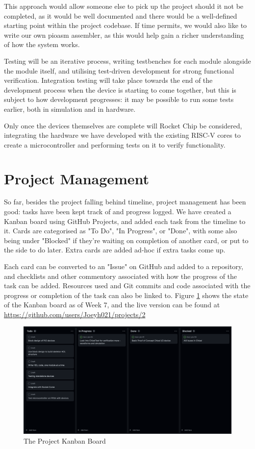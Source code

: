 \documentclass[a4paper,fleqn,12pt]{article}
\begin{document}
This approach would allow someone else to pick up the project should it not be completed, as it would be well documented and there would be a well-defined starting point within the project codebase. If time permits, we would also like to write our own pioasm assembler, as this would help gain a richer understanding of how the system works.

Testing will be an iterative process, writing testbenches for each module alongside the module itself, and utilising test-driven development for strong functional verification. Integration testing will take place towards the end of the development process when the device is starting to come together, but this is subject to how development progresses: it may be possible to run some tests earlier, both in simulation and in hardware.

Only once the devices themselves are complete will Rocket Chip be considered, integrating the hardware we have developed with the existing RISC-V cores to create a microcontroller and performing tests on it to verify functionality.

\section{Project Management}

So far, besides the project falling behind timeline, project management has been good: tasks have been kept track of and progress logged. We have created a Kanban board using GitHub Projects, and added each task from the timeline to it. Cards are categorised as "To Do", "In Progress", or "Done", with some also being under "Blocked" if they're waiting on completion of another card, or put to the side to do later. Extra cards are added ad-hoc if extra tasks come up.

Each card can be converted to an "Issue" on GitHub and added to a repository, and checklists and other commentory associated with how the progress of the task can be added. Resources used and Git commits and code associated with the progress or completion of the task can also be linked to. Figure \ref{fig:kanban} shows the state of the Kanban board as of Week 7, and the live version can be found at \url{https://github.com/users/Joeyh021/projects/2}

\begin{figure}[h!]
	\centering
	\includegraphics[width=\textwidth]{../img/kanban-wk6.png}
	\caption{The Project Kanban Board}
	\label{fig:kanban}
\end{figure}
\end{document}
